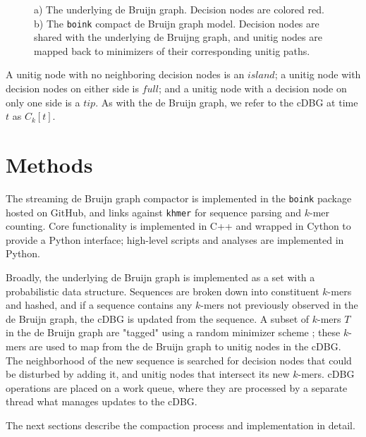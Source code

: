 \documentclass[preprint,number,12pt]{elsarticle}
\begin{document}
\begin{figure}
	\centering
	\caption{\label{fig:cdbg-structure}a)  The underlying de Bruijn graph. Decision nodes are colored red. 
		b) The \texttt{boink} compact de Bruijn graph model. Decision nodes are shared with the underlying de Bruijng graph, and unitig nodes are mapped back to minimizers of their corresponding unitig paths. }
\end{figure}

A unitig node with no neighboring decision nodes is an $island$; a unitig node with decision nodes on either side is $full$; and a unitig node with a decision node on only one side is a $tip$. As with the de Bruijn graph, we refer to the cDBG at time $t$ as $C_k[t]$.


\section{Methods}\label{sec:methods}

The streaming de Bruijn graph compactor is implemented in the \texttt{boink} \cite{boink} package hosted on GitHub, and links against \texttt{khmer} \cite{crusoe2015khmer} for sequence parsing and $k$-mer counting. 
Core functionality is implemented in C++ and wrapped in Cython to provide a Python interface; high-level scripts and analyses are implemented in Python.

Broadly, the underlying de Bruijn graph is implemented as a set with a probabilistic data structure. Sequences are broken down into constituent $k$-mers and hashed, and if a sequence contains any $k$-mers not previously observed in the de Bruijn graph, the cDBG is updated from the sequence. A subset of $k$-mers $T$ in the de Bruijn graph are "tagged" using a random minimizer scheme \cite{roberts2004reducing,marccais2017improving}; these $k$-mers are used to map from the de Bruijn graph to unitig nodes in the cDBG. The neighborhood of the new sequence is searched for decision nodes that could be disturbed by adding it, and unitig nodes that intersect its new $k$-mers. cDBG operations are placed on a work queue, where they are processed by a separate thread what manages updates to the cDBG.

The next sections describe the compaction process and implementation in detail.
\end{document}
